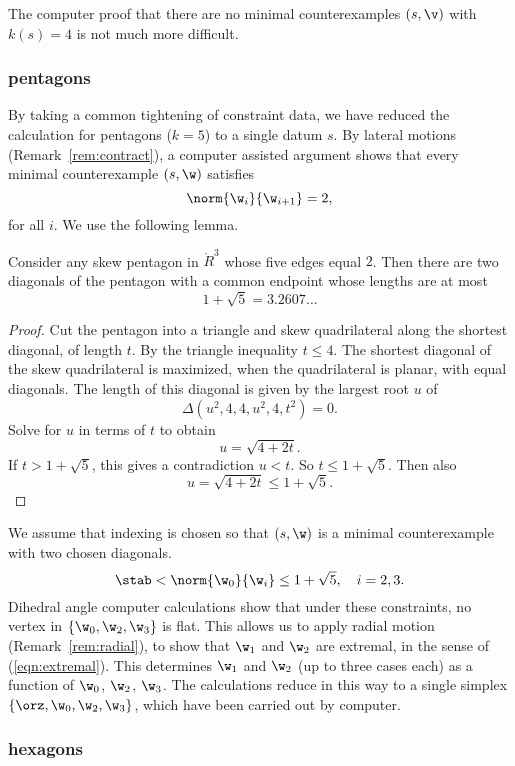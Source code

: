 The computer proof that there are no minimal counterexamples $(s,\v)$
with $k(s)=4$ is not much more difficult.

\subsubsection{pentagons}

By taking a common tightening of constraint data, we have reduced the
calculation for pentagons ($k=5$) to a single datum $s$.   
By lateral motions  (Remark~\ref{rem:contract}), 
a computer assisted argument shows that every minimal
counterexample $(s,\w)$ satisfies
\[
\norm{\w_i}{\w_{i+1}} = 2,
\]
for all $i$.  We use the following lemma.

\begin{lemma}
Consider any skew pentagon in $\ring{R}^3$ whose five edges equal $2$.
Then there are two  diagonals  of the pentagon with a common
endpoint whose lengths  are at most
\[
1 + \sqrt{5} = 3.2607\ldots
\]
\end{lemma}

\begin{proof}
  Cut the pentagon into a triangle and skew quadrilateral along the
  shortest diagonal, of length $t$.  By the triangle inequality
  $t\le4$.  The shortest diagonal of the skew quadrilateral is
  maximized, when the quadrilateral is planar, with equal diagonals.
  The length of this diagonal is given by the largest root $u$ of
\[
\Delta(u^2,4,4,u^2,4,t^2)=0.
\]
Solve for $u$ in terms of $t$ to obtain
\[
u = \sqrt{4 + 2 t}.
\]
If $t>1+\sqrt{5}$, this gives a contradiction $u<t$.  
So $t\le 1+\sqrt{5}$.
Then also
\[
u = \sqrt{4 + 2t} \le 1+\sqrt{5}.
\]
\end{proof}


We assume that indexing is chosen so that $(s,\w)$ is a minimal
counterexample with two chosen diagonals.
\[
\stab < \norm{\w_0}{\w_i} \le 1+\sqrt{5},\quad i=2,3.
\]
Dihedral angle computer calculations show that under these
constraints, no vertex in $\{\w_0,\w_2,\w_3\}$ is flat.  This allows
us to apply radial motion (Remark~\ref{rem:radial}), to show that
$\w_1$ and $\w_2$ are extremal, in the sense of (\ref{eqn:extremal}).
This determines $\w_1$ and $\w_2$ (up to three cases each) as a
function of $\w_0$, $\w_2$, $\w_3$.  The calculations reduce in this
way to a single simplex $\{\orz,\w_0,\w_2,\w_3\}$, which have been
carried out by computer.

\subsubsection{hexagons}


